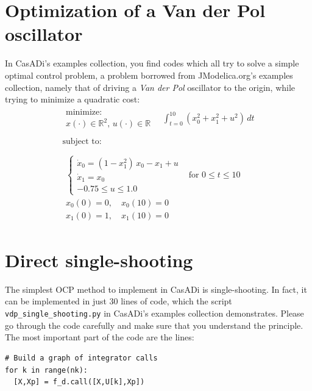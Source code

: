 \documentclass[a4paper,12pt]{book}
\begin{document}
{\section{Optimization of a Van der Pol oscillator}
In CasADi's examples collection, you find codes which all try to solve a simple optimal control problem, a problem borrowed from JModelica.org's examples collection, namely that of driving a \emph{Van der Pol} oscillator to the origin, while trying to minimize a quadratic cost:
\begin{equation}
\begin{array}{lc}
\begin{array}{l}
\text{minimize:} \\
x(\cdot) \in \mathbb{R}^2, \, u(\cdot) \in \mathbb{R}
\end{array}
\quad \displaystyle \int_{t=0}^{10}{(x_0^2 + x_1^2 + u^2) \, dt}
\\
\\
\text{subject to:} \\
\\
\begin{array}{ll}
\left\{
\begin{array}{l}
\dot{x}_0 = (1-x_1^2) \, x_0 - x_1 + u \\
\dot{x}_1 = x_0 \\
-0.75 \le u \le 1.0
\end{array} \right. & \text{for $0 \le t \le 10$} \\
x_0(0)=0, \quad x_0(10)=0  \\
x_1(0)=1, \quad x_1(10)=0  
\end{array}
\end{array}
\label{eq:vdp}
\end{equation}

\section{Direct single-shooting}
The simplest OCP method to implement in CasADi is single-shooting. In fact, it can be implemented in just 30 lines of code, which the script {\texttt{vdp\_single\_shooting.py}} in CasADi's examples collection demonstrates. Please go through the code carefully and make sure that you understand the principle. The most important part of the code are the lines:
\begin{verbatim}
# Build a graph of integrator calls
for k in range(nk):
  [X,Xp] = f_d.call([X,U[k],Xp])
\end{verbatim}

}
\end{document}
